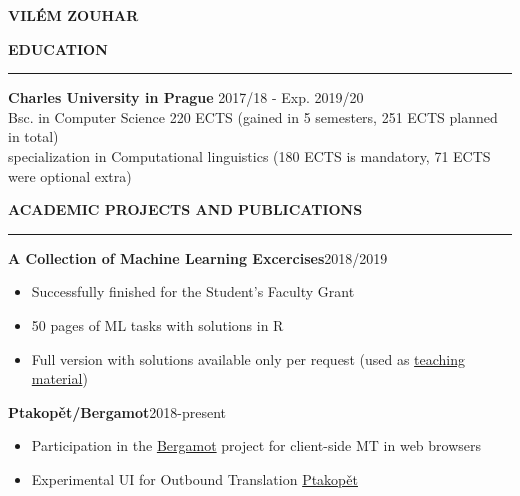 \documentclass[11pt,a4paper]{article} %
\newcommand{\hSection}[1]{
    \medskip
    \MakeUppercase{\bf #1}
    \medskip
    \hrule
}
\newcommand{\hSubsectionI}[2]{{\bf #1}\hfill {#2}\hspace{-1cm}}
\begin{document}
\begin{center}
    {\LARGE \bf VILÉM ZOUHAR} \\
    {\large \href{mailto:vilem.zouhar@mff.cuni.cz}{\color{black}{vilem.zouhar@mff.cuni.cz}}}
\end{center}

\vspace{0.1cm}

\hSection{Education}\vspace{0.2cm}
{\bf Charles University in Prague} \hfill {2017/18 - Exp. 2019/20} \\
Bsc. in Computer Science \hfill 220 ECTS {\footnotesize (gained in 5 semesters, 251 ECTS planned in total)} \\
specialization in Computational linguistics \hfill {\footnotesize (180 ECTS is mandatory, 71 ECTS were optional extra)} \hspace{-1.2cm}

\hSection{Academic Projects and Publications}

\hSubsectionI{A Collection of Machine Learning Excercises}{2018/2019}

\begin{itemize}
    \item Successfully finished for the Student's Faculty Grant
    \item 50 pages of ML tasks with solutions in R
    \item Full version with solutions available only per request (used as \href{http://ufal.mff.cuni.cz/courses/npfl054}{teaching material})
\end{itemize}

\hSubsectionI{Ptakopět/Bergamot}{2018-present}

\begin{itemize}
    \item Participation in the \href{http://browser.mt/}{Bergamot} project for client-side MT in web browsers
    \item Experimental UI for Outbound Translation \href{https://github.com/zouharvi/ptakopet}{Ptakopět}
\end{itemize}
\end{document}
